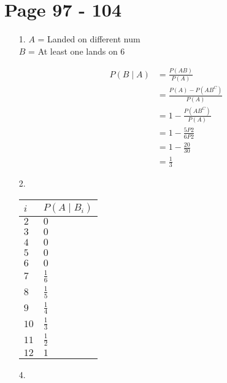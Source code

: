\documentclass{article}
\begin{document}
\section*{Page 97 - 104}
\begin{itemize}
\item [1.]
  $A$ = Landed on different num\\
  $B$ = At least one lands on $6$

  \begin{equation*}
    \begin{split}
      P(B \mid A) &= \frac{P(AB)}{P(A)}\\
      &= \frac{P(A)-P(AB^C)}{P(A)}\\
      &= 1 - \frac{P(AB^C)}{P(A)}\\
      &= 1 - \frac{5P2}{6P2}\\
      &= 1 - \frac{20}{30} \\
      &= \frac{1}{3}
    \end{split}
  \end{equation*}
\item [2.]
  \begin{tabular}{ll}
\(i\) & \(P(A\mid B_i)\)\\
\hline
\(2\) & \(0\)\\
\(3\) & \(0\)\\
\(4\) & \(0\)\\
\(5\) & \(0\)\\
\(6\) & \(0\)\\
\(7\) & \(\frac{1}{6}\)\\
\(8\) & \(\frac{1}{5}\)\\
\(9\) & \(\frac{1}{4}\)\\
\(10\) & \(\frac{1}{3}\)\\
\(11\) & \(\frac{1}{2}\)\\
\(12\) & \(1\)\\
\end{tabular}
\begin{comment}
#+ORGTBL: SEND 3.2 orgtbl-to-latex :splice nil :skip 0
| $i$  | $P(A\mid B_i)$ |
|------+----------------|
| $2$  | $0$            |
| $3$  | $0$            |
| $4$  | $0$            |
| $5$  | $0$            |
| $6$  | $0$            |
| $7$  | $\frac{1}{6}$  |
| $8$  | $\frac{1}{5}$  |
| $9$  | $\frac{1}{4}$  |
| $10$ | $\frac{1}{3}$  |
| $11$ | $\frac{1}{2}$  |
| $12$ | $1$            |
\end{comment}
\item [4.]
  

\end{itemize}
\end{document}
